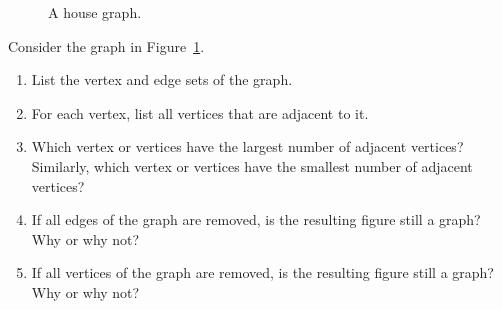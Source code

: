 \begin{figure}[!htbp]
\centering
{}
\caption{A house graph.}
\label{fig:introduction:house_graph}
\end{figure}

\begin{exercise}
\label{ex:introduction:house_graph}
Consider the graph in Figure~\ref{fig:introduction:house_graph}.
%
\begin{enumerate}
\item List the vertex and edge sets of the graph.

\item For each vertex, list all vertices that are adjacent to it.

\item Which vertex or vertices have the largest number of adjacent
  vertices? Similarly, which vertex or vertices have the smallest
  number of adjacent vertices?

\item If all edges of the graph are removed, is the resulting figure
  still a graph? Why or why not?

\item If all vertices of the graph are removed, is the resulting
  figure still a graph? Why or why not?
\end{enumerate}
\end{exercise}


